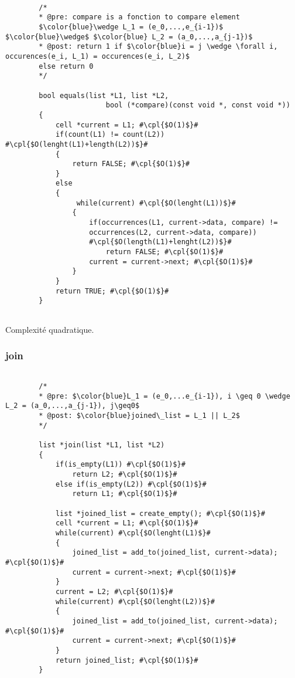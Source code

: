 \documentclass[a4paper, 11pt, oneside]{article}
\begin{document}
	\begin{lstlisting}[mathescape]	
	
		/*
		* @pre: compare is a fonction to compare element  
		$\color{blue}\wedge L_1 = (e_0,...,e_{i-1})$ $\color{blue}\wedge$ $\color{blue} L_2 = (a_0,...,a_{j-1})$
		* @post: return 1 if $\color{blue}i = j \wedge \forall i, occurences(e_i, L_1) = occurences(e_i, L_2)$ 
		else return 0
		*/
		
		bool equals(list *L1, list *L2, 
						bool (*compare)(const void *, const void *))
		{
   			cell *current = L1; #\cpl{$O(1)$}#
   			if(count(L1) != count(L2)) #\cpl{$O(lenght(L1)+length(L2))$}#
   			{
      			return FALSE; #\cpl{$O(1)$}# 
   			}
   			else
   			{
     			 while(current) #\cpl{$O(lenght(L1))$}#
      			{
         			if(occurrences(L1, current->data, compare) != 
         			occurrences(L2, current->data, compare)) 
         			#\cpl{$O(length(L1)+lenght(L2))$}#
            			return FALSE; #\cpl{$O(1)$}#
         			current = current->next; #\cpl{$O(1)$}#
      			}
   			}
  			return TRUE; #\cpl{$O(1)$}#
		}
	
	\end{lstlisting}
	
	Complexité quadratique.
	
	\subsubsection{join}
	
	\begin{lstlisting}[mathescape]	
	
		/*
		* @pre: $\color{blue}L_1 = (e_0,...e_{i-1}), i \geq 0 \wedge L_2 = (a_0,...,a_{j-1}), j\geq0$
		* @post: $\color{blue}joined\_list = L_1 || L_2$
		*/
		
		list *join(list *L1, list *L2)
		{
   			if(is_empty(L1)) #\cpl{$O(1)$}#
      			return L2; #\cpl{$O(1)$}#
   			else if(is_empty(L2)) #\cpl{$O(1)$}#
      			return L1; #\cpl{$O(1)$}#

   			list *joined_list = create_empty(); #\cpl{$O(1)$}#
   			cell *current = L1; #\cpl{$O(1)$}#
   			while(current) #\cpl{$O(lenght(L1)$}#
   			{
      			joined_list = add_to(joined_list, current->data); #\cpl{$O(1)$}#
      			current = current->next; #\cpl{$O(1)$}#
   			}
   			current = L2; #\cpl{$O(1)$}#
   			while(current) #\cpl{$O(lenght(L2))$}#
   			{
      			joined_list = add_to(joined_list, current->data); #\cpl{$O(1)$}#
      			current = current->next; #\cpl{$O(1)$}#
   			}
   			return joined_list; #\cpl{$O(1)$}#
		}	
	
	\end{lstlisting}
	
\end{document}
